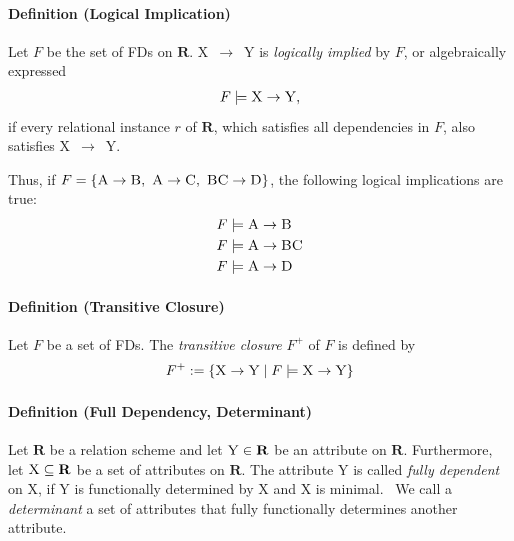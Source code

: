 \paragraph{Definition (Logical Implication)} Let \( F \) be the set of FDs on \( \boldsymbol{R} \).
\textsc{X}~\( \rightarrow  \)~\textsc{Y} is \emph{logically implied} by \( F \), or algebraically expressed
\begin{align}
    F \models \textsc{X} \rightarrow \textsc{Y},
\end{align}
if every relational instance \( r \) of \( \boldsymbol{R} \), which satisfies all dependencies in \( F \), also satisfies \textsc{X}~\( \rightarrow \)~\textsc{Y}.~\cite[p.~166]{STU16}

Thus, if \( F = \{ \textsc{A} \rightarrow \textsc{B},~\textsc{A} \rightarrow \textsc{C},~\textsc{BC} \rightarrow \textsc{D} \} \), the following logical implications are true:
\begin{align*}
    &F \models \textsc{A} \rightarrow \textsc{B} \\
    &F \models \textsc{A} \rightarrow \textsc{BC} \\
    &F \models \textsc{A} \rightarrow \textsc{D}
\end{align*}

\paragraph{Definition (Transitive Closure)} Let \( F \) be a set of FDs.
The \emph{transitive closure} \( F^{+} \) of \( F \) is defined by
\begin{align}\label{eq:transitive-closure}
    F^{+} := \{ \textsc{X} \rightarrow \textsc{Y} \mid F \models \textsc{X} \rightarrow \textsc{Y} \}
\end{align}

\paragraph{Definition (Full Dependency, Determinant)} Let \( \mathbf{R} \) be a relation scheme and let \( \textsc{Y} \in \mathbf{R} \) be an attribute on \( \mathbf{R} \).
Furthermore, let \( \textsc{X} \subseteq \mathbf{R} \) be a set of attributes on \( \mathbf{R} \).
The attribute \textsc{Y} is called \emph{fully dependent} on \textsc{X}, if \textsc{Y} is functionally determined by \textsc{X} and \textsc{X} is minimal.~\cite[p.~61]{SCH17}
We call a \emph{determinant} a set of attributes that fully functionally determines another attribute.

